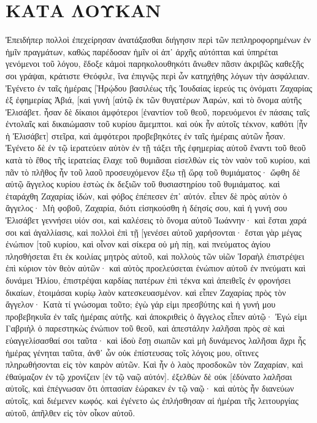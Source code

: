 \section{ΚΑΤΑ ΛΟΥΚΑΝ}
Ἐπειδήπερ πολλοὶ ἐπεχείρησαν ἀνατάξασθαι διήγησιν περὶ τῶν πεπληροφορημένων ἐν ἡμῖν πραγμάτων, 
καθὼς παρέδοσαν ἡμῖν οἱ ἀπ᾽ ἀρχῆς αὐτόπται καὶ ὑπηρέται γενόμενοι τοῦ λόγου, 
ἔδοξε κἀμοὶ παρηκολουθηκότι ἄνωθεν πᾶσιν ἀκριβῶς καθεξῆς σοι γράψαι, κράτιστε Θεόφιλε, 
ἵνα ἐπιγνῷς περὶ ὧν κατηχήθης λόγων τὴν ἀσφάλειαν. 
Ἐγένετο ἐν ταῖς ἡμέραις [Ἡρῴδου βασιλέως τῆς Ἰουδαίας ἱερεύς τις ὀνόματι Ζαχαρίας ἐξ ἐφημερίας Ἀβιά, [καὶ γυνὴ [αὐτῷ ἐκ τῶν θυγατέρων Ἀαρών, καὶ τὸ ὄνομα αὐτῆς Ἐλισάβετ. 
ἦσαν δὲ δίκαιοι ἀμφότεροι [ἐναντίον τοῦ θεοῦ, πορευόμενοι ἐν πάσαις ταῖς ἐντολαῖς καὶ δικαιώμασιν τοῦ κυρίου ἄμεμπτοι. 
καὶ οὐκ ἦν αὐτοῖς τέκνον, καθότι [ἦν ἡ Ἐλισάβετ] στεῖρα, καὶ ἀμφότεροι προβεβηκότες ἐν ταῖς ἡμέραις αὐτῶν ἦσαν. 
Ἐγένετο δὲ ἐν τῷ ἱερατεύειν αὐτὸν ἐν τῇ τάξει τῆς ἐφημερίας αὐτοῦ ἔναντι τοῦ θεοῦ 
κατὰ τὸ ἔθος τῆς ἱερατείας ἔλαχε τοῦ θυμιᾶσαι εἰσελθὼν εἰς τὸν ναὸν τοῦ κυρίου, 
καὶ πᾶν τὸ πλῆθος ἦν τοῦ λαοῦ προσευχόμενον ἔξω τῇ ὥρᾳ τοῦ θυμιάματος· 
ὤφθη δὲ αὐτῷ ἄγγελος κυρίου ἑστὼς ἐκ δεξιῶν τοῦ θυσιαστηρίου τοῦ θυμιάματος. 
καὶ ἐταράχθη Ζαχαρίας ἰδών, καὶ φόβος ἐπέπεσεν ἐπ᾽ αὐτόν. 
εἶπεν δὲ πρὸς αὐτὸν ὁ ἄγγελος· Μὴ φοβοῦ, Ζαχαρία, διότι εἰσηκούσθη ἡ δέησίς σου, καὶ ἡ γυνή σου Ἐλισάβετ γεννήσει υἱόν σοι, καὶ καλέσεις τὸ ὄνομα αὐτοῦ Ἰωάννην· 
καὶ ἔσται χαρά σοι καὶ ἀγαλλίασις, καὶ πολλοὶ ἐπὶ τῇ [γενέσει αὐτοῦ χαρήσονται· 
ἔσται γὰρ μέγας ἐνώπιον [τοῦ κυρίου, καὶ οἶνον καὶ σίκερα οὐ μὴ πίῃ, καὶ πνεύματος ἁγίου πλησθήσεται ἔτι ἐκ κοιλίας μητρὸς αὐτοῦ, 
καὶ πολλοὺς τῶν υἱῶν Ἰσραὴλ ἐπιστρέψει ἐπὶ κύριον τὸν θεὸν αὐτῶν· 
καὶ αὐτὸς προελεύσεται ἐνώπιον αὐτοῦ ἐν πνεύματι καὶ δυνάμει Ἠλίου, ἐπιστρέψαι καρδίας πατέρων ἐπὶ τέκνα καὶ ἀπειθεῖς ἐν φρονήσει δικαίων, ἑτοιμάσαι κυρίῳ λαὸν κατεσκευασμένον. 
καὶ εἶπεν Ζαχαρίας πρὸς τὸν ἄγγελον· Κατὰ τί γνώσομαι τοῦτο; ἐγὼ γάρ εἰμι πρεσβύτης καὶ ἡ γυνή μου προβεβηκυῖα ἐν ταῖς ἡμέραις αὐτῆς. 
καὶ ἀποκριθεὶς ὁ ἄγγελος εἶπεν αὐτῷ· Ἐγώ εἰμι Γαβριὴλ ὁ παρεστηκὼς ἐνώπιον τοῦ θεοῦ, καὶ ἀπεστάλην λαλῆσαι πρὸς σὲ καὶ εὐαγγελίσασθαί σοι ταῦτα· 
καὶ ἰδοὺ ἔσῃ σιωπῶν καὶ μὴ δυνάμενος λαλῆσαι ἄχρι ἧς ἡμέρας γένηται ταῦτα, ἀνθ᾽ ὧν οὐκ ἐπίστευσας τοῖς λόγοις μου, οἵτινες πληρωθήσονται εἰς τὸν καιρὸν αὐτῶν. 
Καὶ ἦν ὁ λαὸς προσδοκῶν τὸν Ζαχαρίαν, καὶ ἐθαύμαζον ἐν τῷ χρονίζειν [ἐν τῷ ναῷ αὐτόν]. 
ἐξελθὼν δὲ οὐκ [ἐδύνατο λαλῆσαι αὐτοῖς, καὶ ἐπέγνωσαν ὅτι ὀπτασίαν ἑώρακεν ἐν τῷ ναῷ· καὶ αὐτὸς ἦν διανεύων αὐτοῖς, καὶ διέμενεν κωφός. 
καὶ ἐγένετο ὡς ἐπλήσθησαν αἱ ἡμέραι τῆς λειτουργίας αὐτοῦ, ἀπῆλθεν εἰς τὸν οἶκον αὐτοῦ. 
